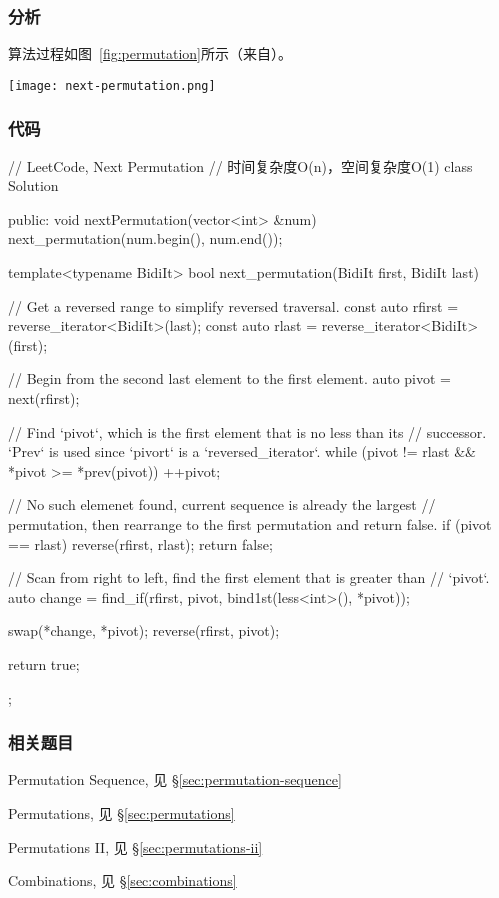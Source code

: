 \subsubsection{分析}
算法过程如图~\ref{fig:permutation}所示（来自）。

\begin{center}
	\texttt{[image: next-permutation.png]}\\
	\label{fig:permutation}
\end{center}


\subsubsection{代码}
\begin{Code}
	// LeetCode, Next Permutation
	// 时间复杂度O(n)，空间复杂度O(1)
	class Solution {
		public:
		void nextPermutation(vector<int> &num) {
			next_permutation(num.begin(), num.end());
		}
		
		template<typename BidiIt>
		bool next_permutation(BidiIt first, BidiIt last) {
			// Get a reversed range to simplify reversed traversal.
			const auto rfirst = reverse_iterator<BidiIt>(last);
			const auto rlast = reverse_iterator<BidiIt>(first);
			
			// Begin from the second last element to the first element.
			auto pivot = next(rfirst);
			
			// Find `pivot`, which is the first element that is no less than its
			// successor.  `Prev` is used since `pivort` is a 
			`reversed_iterator`.
			while (pivot != rlast && *pivot >= *prev(pivot))
			++pivot;
			
			// No such elemenet found, current sequence is already the largest
			// permutation, then rearrange to the first permutation and return 
			false.
			if (pivot == rlast) {
				reverse(rfirst, rlast);
				return false;
			}
			
			// Scan from right to left, find the first element that is greater 
			than
			// `pivot`.
			auto change = find_if(rfirst, pivot, bind1st(less<int>(), *pivot));
			
			swap(*change, *pivot);
			reverse(rfirst, pivot);
			
			return true;
		}
	};
\end{Code}


\subsubsection{相关题目}
\begindot
\item Permutation Sequence, 见 \S \ref{sec:permutation-sequence}
\item Permutations, 见 \S \ref{sec:permutations}
\item Permutations II, 见 \S \ref{sec:permutations-ii}
\item Combinations, 见 \S \ref{sec:combinations}
\myenddot


